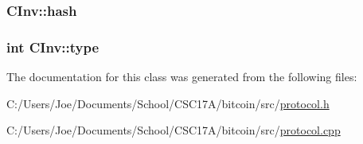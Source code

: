 \subsubsection[{hash}]{ C\+Inv\+::hash}\label{class_c_inv_abfa04c38e9c0def9a2b09a9c43929744}
\hypertarget{class_c_inv_a2da8a26c6b8824011e3144459d278c75}{}
\subsubsection[{type}]{\setlength{\rightskip}{0pt plus 5cm}int C\+Inv\+::type}\label{class_c_inv_a2da8a26c6b8824011e3144459d278c75}


The documentation for this class was generated from the following files\+:\begin{DoxyCompactItemize}
\item 
C\+:/\+Users/\+Joe/\+Documents/\+School/\+C\+S\+C17\+A/bitcoin/src/\hyperlink{protocol_8h}{protocol.\+h}\item 
C\+:/\+Users/\+Joe/\+Documents/\+School/\+C\+S\+C17\+A/bitcoin/src/\hyperlink{protocol_8cpp}{protocol.\+cpp}\end{DoxyCompactItemize}
